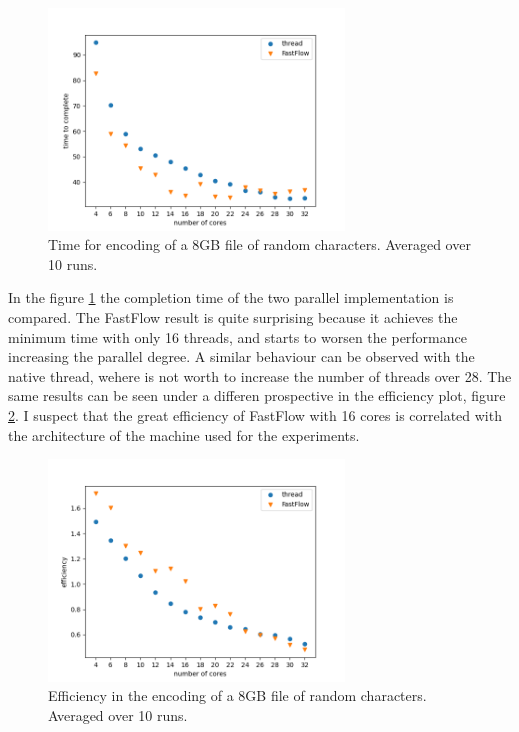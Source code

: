 \documentclass[12pt, letterpaper]{article}
\begin{document}
\begin{figure}
    \centering
    \includegraphics[width=0.7\textwidth]{./images/time_to_complete.png}
    \caption{Time for encoding of a 8GB file of random characters. Averaged over 10 runs.}
    \label{fig:time_to_complete}
\end{figure}

In the figure \ref{fig:time_to_complete} the completion time of the two parallel implementation is compared. The FastFlow result is quite surprising because it achieves the minimum time with only 16 threads, and starts to worsen the performance increasing the parallel degree. A similar behaviour can be observed with the native thread, wehere is not worth to increase the number of threads over 28. The same results can be seen under a differen prospective in the efficiency plot, figure \ref{fig:efficiency}. I suspect that the great efficiency of FastFlow with 16 cores is correlated with the architecture of the machine used for the experiments.


\begin{figure}
    \centering
    \includegraphics[width=0.7\textwidth]{./images/efficiency.png}
    \caption{Efficiency in the encoding of a 8GB file of random characters. Averaged over 10 runs.}
    \label{fig:efficiency}
\end{figure}
\end{document}
